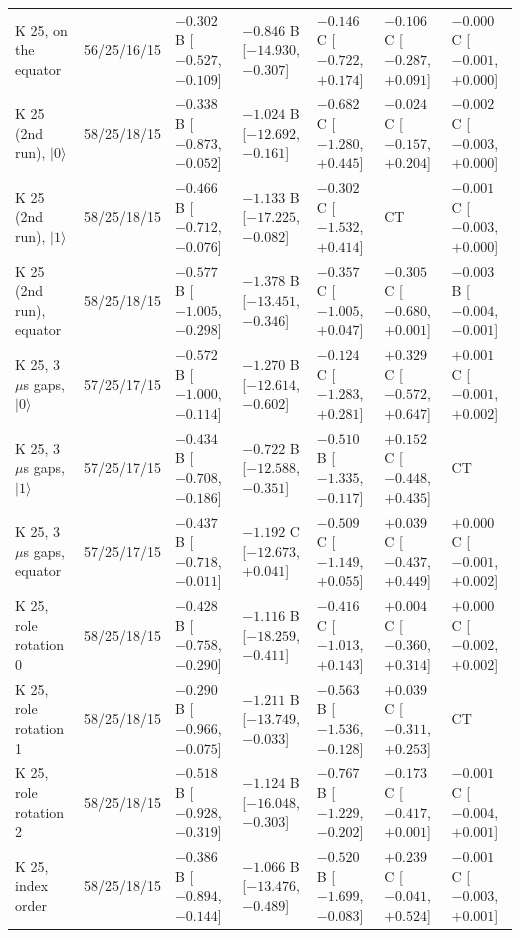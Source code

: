 \documentclass[reprint,amsmath,amssymb,aps,superscriptaddress,nofootinbib]{revtex4-2}
\newcommand{\us}{\,$\mu$s}
\begin{document}
\begin{table}[!tp]
\begin{tabular}{p{3.6cm}p{1.6cm}p{2.15cm}p{2.15cm}p{2.15cm}p{2.15cm}p{2.15cm}}
K 25, on the equator & 56/25/16/15 & $-0.302$ B [$-0.527$,$-0.109$] & $-0.846$ B [$-14.930$,$-0.307$] & $-0.146$ C [$-0.722$,$+0.174$] & $-0.106$ C [$-0.287$,$+0.091$] & $-0.000$ C [$-0.001$,$+0.000$] \\
K 25 (2nd run), $|0\rangle$ & 58/25/18/15 & $-0.338$ B [$-0.873$,$-0.052$] & $-1.024$ B [$-12.692$,$-0.161$] & $-0.682$ C [$-1.280$,$+0.445$] & $-0.024$ C [$-0.157$,$+0.204$] & $-0.002$ C [$-0.003$,$+0.000$] \\
K 25 (2nd run), $|1\rangle$ & 58/25/18/15 & $-0.466$ B [$-0.712$,$-0.076$] & $-1.133$ B [$-17.225$,$-0.082$] & $-0.302$ C [$-1.532$,$+0.414$] & CT & $-0.001$ C [$-0.003$,$+0.000$] \\
K 25 (2nd run), equator & 58/25/18/15 & $-0.577$ B [$-1.005$,$-0.298$] & $-1.378$ B [$-13.451$,$-0.346$] & $-0.357$ C [$-1.005$,$+0.047$] & $-0.305$ C [$-0.680$,$+0.001$] & $-0.003$ B [$-0.004$,$-0.001$] \\
K 25, 3\us{} gaps, $|0\rangle$ & 57/25/17/15 & $-0.572$ B [$-1.000$,$-0.114$] & $-1.270$ B [$-12.614$,$-0.602$] & $-0.124$ C [$-1.283$,$+0.281$] & $+0.329$ C [$-0.572$,$+0.647$] & $+0.001$ C [$-0.001$,$+0.002$] \\
K 25, 3\us{} gaps, $|1\rangle$ & 57/25/17/15 & $-0.434$ B [$-0.708$,$-0.186$] & $-0.722$ B [$-12.588$,$-0.351$] & $-0.510$ B [$-1.335$,$-0.117$] & $+0.152$ C [$-0.448$,$+0.435$] & CT \\
K 25, 3\us{} gaps, equator & 57/25/17/15 & $-0.437$ B [$-0.718$,$-0.011$] & $-1.192$ C [$-12.673$,$+0.041$] & $-0.509$ C [$-1.149$,$+0.055$] & $+0.039$ C [$-0.437$,$+0.449$] & $+0.000$ C [$-0.001$,$+0.002$] \\
K 25, role rotation 0 & 58/25/18/15 & $-0.428$ B [$-0.758$,$-0.290$] & $-1.116$ B [$-18.259$,$-0.411$] & $-0.416$ C [$-1.013$,$+0.143$] & $+0.004$ C [$-0.360$,$+0.314$] & $+0.000$ C [$-0.002$,$+0.002$] \\
K 25, role rotation 1 & 58/25/18/15 & $-0.290$ B [$-0.966$,$-0.075$] & $-1.211$ B [$-13.749$,$-0.033$] & $-0.563$ B [$-1.536$,$-0.128$] & $+0.039$ C [$-0.311$,$+0.253$] & CT \\
K 25, role rotation 2 & 58/25/18/15 & $-0.518$ B [$-0.928$,$-0.319$] & $-1.124$ B [$-16.048$,$-0.303$] & $-0.767$ B [$-1.229$,$-0.202$] & $-0.173$ C [$-0.417$,$+0.001$] & $-0.001$ C [$-0.004$,$+0.001$] \\
K 25, index order & 58/25/18/15 & $-0.386$ B [$-0.894$,$-0.144$] & $-1.066$ B [$-13.476$,$-0.489$] & $-0.520$ B [$-1.699$,$-0.083$] & $+0.239$ C [$-0.041$,$+0.524$] & $-0.001$ C [$-0.003$,$+0.001$] \\

\end{tabular}
\end{table}
\end{document}
